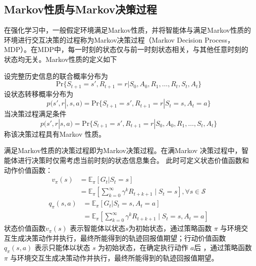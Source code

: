 \subsection{Markov性质与Markov决策过程}

在强化学习中，一般假定环境满足Markov性质，并将智能体与满足Markov性质的环境进行交互决策的过程称为Markov决策过程（Markov Decision Process，MDP）\cite{white1963dynamic,ross1996stochastic}。在MDP中，每一时刻的状态仅与前一时刻状态相关，与其他任意时刻的状态均无关。Markov性质的定义如下
\begin{definition}
设完整历史信息的联合概率分布为
\begin{equation}
    \mathrm{Pr}\{S_{t+1}=s',R_{t+1}=r|S_0,A_0,R_1,\ldots,R_t,S_t,A_t\}
\end{equation}
设状态转移概率分布为
\begin{equation}
    p(s',r|,s,a) = \mathrm{Pr}\{S_{t+1}=s',R_{t+1}=r|S_t=s,A_t=a\}
\end{equation}
当决策过程满足条件
\begin{equation}
  p(s',r|s,a) = \mathrm{Pr}\{S_{t+1}=s',R_{t+1}=r|S_0,A_0,R_1,\ldots,S_t,A_t\}  
\end{equation}
称该决策过程具有Markov 性质。
\end{definition}

满足Markov性质的决策过程即为Markov决策过程\cite{sutton2018reinforcement,white1963dynamic}。在满Markov 决策过程中，智能体进行决策时仅需考虑当前时刻的状态信息集合。
此时可定义状态价值函数和动作价值函数：
\begin{equation}
\begin{aligned}
    v_{\pi}(s)&=\mathbb{E}_{\pi}\left[G_t|S_t=s\right]\\
    &=\mathbb{E}_{\pi}\left[\sum_{k=0}^{\infty}\gamma^kR_{t+k+1}\mid S_t=s\right], \forall s \in \mathcal{S}
\end{aligned}
\end{equation}
\begin{equation}
\begin{aligned}
    q_{\pi}(s,a)&=\mathbb{E}_{\pi}\left[G_t|S_t=s,A_t=a\right]\\
    &=\mathbb{E}_{\pi}\left[\sum_{k=0}^{\infty}\gamma^kR_{t+k+1}\mid S_t=s,A_t=a\right]
\end{aligned}
\end{equation}
状态价值函数$v_\pi(s)$ 表示智能体以状态$s$为初始状态，通过策略函数 $\pi$ 与环境交互生成决策动作并执行，最终所能得到的轨迹回报值期望；行动价值函数 $q_\pi(s,a)$ 表示只能体以状态 $s$ 为初始状态，在确定执行动作 $a$后 ，通过策略函数 $\pi$ 与环境交互生成决策动作并执行，最终所能得到的轨迹回报值期望。

